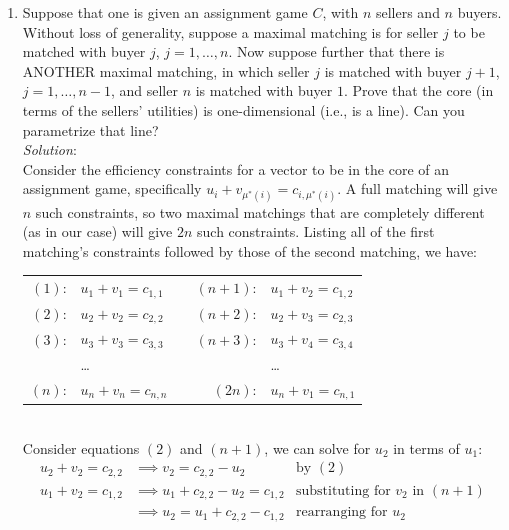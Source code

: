 \documentclass{article}
\begin{document}
\begin{enumerate}
%
\newpage
\item Suppose that one is given an assignment game $C$, with $n$ sellers and $n$ buyers. Without loss of generality, suppose a maximal matching is for seller $j$ to be matched with buyer $j$, $j = 1, \dots, n$. Now suppose further that there is ANOTHER maximal matching, in which seller $j$ is matched with buyer $j + 1$, $j = 1, \dots, n - 1$,  and seller $n$ is matched with buyer $1$. Prove that the core (in terms of the sellers' utilities) is one-dimensional (i.e., is a line). Can you parametrize that line? \\

\textit{Solution}: \\
Consider the efficiency constraints for a vector to be in the core of an assignment game, specifically $u_{i} + v_{\mu^{*}(i)} = c_{i,\mu^{*}(i)}$. A full matching will give $n$ such constraints, so two maximal matchings that are completely different (as in our case) will give $2n$ such constraints. Listing all of the first matching's constraints followed by those of the second matching, we have: \\

\begin{tabular}{r l  c  r l}
$(1)$:  & $u_{1} + v_{1} = c_{1,1}$ &   & $(n + 1)$:  & $u_{1} + v_{2} = c_{1,2}$ \\
$(2)$:  & $u_{2} + v_{2} = c_{2,2}$ &   & $(n + 2)$:  & $u_{2} + v_{3} = c_{2,3}$ \\
$(3)$:  & $u_{3} + v_{3} = c_{3,3}$ &   & $(n + 3)$:  & $u_{3} + v_{4} = c_{3,4}$ \\
        & \dots                     &   &             & \dots                     \\
$(n)$:  & $u_{n} + v_{n} = c_{n,n}$ &   & $(2n)$:     & $u_{n} + v_{1} = c_{n,1}$ \\
\end{tabular} \\

Consider equations $(2)$ and $(n + 1)$, we can solve for $u_{2}$ in terms of $u_{1}$:
\begin{align*}
u_{2} + v_{2} = c_{2,2} &\implies v_{2} = c_{2,2} - u_{2}             &\text{by } (2)   \\
u_{1} + v_{2} = c_{1,2} &\implies u_{1} + c_{2,2} - u_{2} = c_{1, 2}  &\text{substituting for } v_{2} \text{ in } (n + 1) \\
                        &\implies u_{2} = u_{1} + c_{2,2} - c_{1,2}   &\text{rearranging for } u_{2}
\end{align*}


\end{enumerate}
\end{document}
